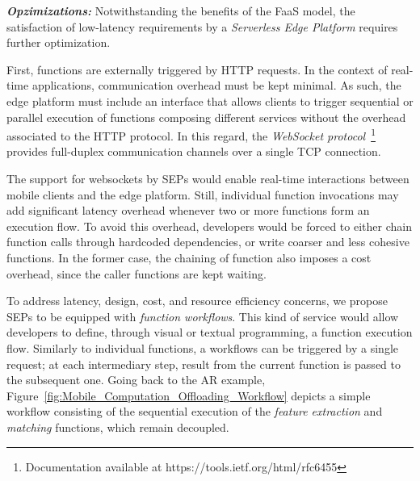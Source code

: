 


\textbf{\textit{Opzimizations:}} Notwithstanding the benefits of the FaaS model,
the satisfaction of low-latency requirements by a \textit{Serverless Edge Platform} requires further optimization.

First, functions are externally triggered by HTTP requests. In the context of real-time applications, communication overhead must be kept minimal. As such, the edge platform must include an interface that allows clients to trigger sequential or parallel execution of functions composing different services without the overhead associated to the HTTP protocol. In this regard, the \textit{WebSocket protocol}~\footnote{Documentation available at https://tools.ietf.org/html/rfc6455}
provides full-duplex communication channels over a single TCP connection. %


The support for websockets by SEPs would enable real-time interactions between mobile clients and the edge platform. Still, individual function invocations may add significant latency overhead whenever two or more functions form an execution flow. To avoid this overhead, developers would be forced to either chain function calls through hardcoded dependencies, or write coarser and less cohesive functions. In the former case, the chaining of function also imposes a cost overhead, since the caller functions are kept waiting.%

To address latency, design, cost, and resource efficiency concerns, we propose SEPs to be equipped with \textit{function workflows}. This kind of service would allow developers to define, through visual or textual programming, a function execution flow.
Similarly to individual functions, a workflows can be triggered by a single request; at each intermediary step, result from the current function is passed to the subsequent one. Going back to the AR example, Figure~\ref{fig:Mobile_Computation_Offloading_Workflow} depicts a simple workflow consisting of the sequential execution of the \textit{feature extraction} and \textit{matching} functions, which remain decoupled.%

